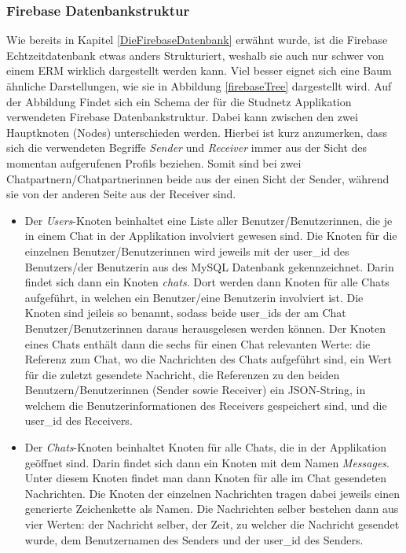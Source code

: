 \documentclass[../main.tex]{subfiles}
\begin{document}
	\subsubsection{Firebase Datenbankstruktur}
	Wie bereits in Kapitel \ref{DieFirebaseDatenbank} erwähnt wurde, ist die Firebase Echtzeitdatenbank etwas anders Strukturiert, weshalb sie auch nur schwer von einem ERM wirklich dargestellt werden kann. Viel besser eignet sich eine Baum ähnliche Darstellungen, wie sie in Abbildung \ref{firebaseTree} dargestellt wird. Auf der Abbildung Findet sich ein Schema der für die Studnetz Applikation verwendeten Firebase Datenbankstruktur. Dabei kann zwischen den zwei Hauptknoten (Nodes) unterschieden werden. Hierbei ist kurz anzumerken, dass sich die verwendeten Begriffe \emph{Sender} und \emph{Receiver} immer aus der Sicht des momentan aufgerufenen Profils beziehen. Somit sind bei zwei Chatpartnern/Chatpartnerinnen beide aus der einen Sicht der Sender, während sie von der anderen Seite aus der Receiver sind.
	
	\begin{itemize}
		\item Der \emph{Users}-Knoten beinhaltet eine Liste aller Benutzer/Benutzerinnen, die je in einem Chat in der Applikation involviert gewesen sind. Die Knoten für die einzelnen Benutzer/Benutzerinnen wird jeweils mit der user\_id des Benutzers/der Benutzerin aus des MySQL Datenbank gekennzeichnet. Darin findet sich dann ein Knoten \emph{chats}. Dort werden dann Knoten für alle Chats aufgeführt, in welchen ein Benutzer/eine Benutzerin involviert ist. Die Knoten sind jeileis so benannt, sodass beide user\_ids der am Chat Benutzer/Benutzerinnen daraus herausgelesen werden können. Der Knoten eines Chats enthält dann die sechs für einen Chat relevanten Werte: die Referenz zum Chat, wo die Nachrichten des Chats aufgeführt sind, ein Wert für die zuletzt gesendete Nachricht, die Referenzen zu den beiden Benutzern/Benutzerinnen (Sender sowie Receiver) ein JSON-String, in welchem die Benutzerinformationen des Receivers gespeichert sind, und die user\_id des Receivers.
		\item  Der \emph{Chats}-Knoten beinhaltet Knoten für alle Chats, die in der Applikation geöffnet sind. Darin findet sich dann ein Knoten mit dem Namen \emph{Messages}. Unter diesem Knoten findet man dann Knoten für alle im Chat gesendeten Nachrichten. Die Knoten der einzelnen Nachrichten tragen dabei jeweils einen generierte Zeichenkette als Namen. Die Nachrichten selber bestehen dann aus vier Werten: der Nachricht selber, der Zeit, zu welcher die Nachricht gesendet wurde, dem Benutzernamen des Senders und der user\_id des Senders.
	\end{itemize}
\end{document}
